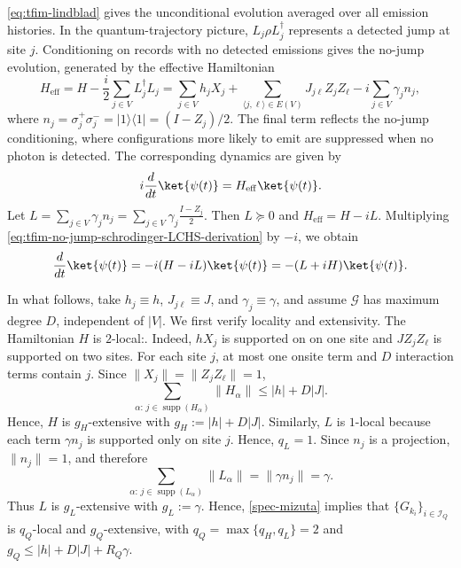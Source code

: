 \documentclass[10pt,reqno]{article}
\numberwithin{equation}{section}
\theoremstyle{plain}
\theoremstyle{definition}
\begin{document}
\cref{eq:tfim-lindblad} gives the unconditional evolution averaged over all emission histories. In the quantum-trajectory picture, \(L_j\rho L_j^\dagger\) represents a detected jump at site \(j\). Conditioning on records with no detected emissions gives the no-jump evolution, generated by the effective Hamiltonian
\begin{equation}\label{eq:tfim-effective-Hamiltonian}
H_{\operatorname{eff}} = H-\frac{i}{2}\sum_{j\in V}L_j^\dagger L_j = \sum_{j\in V} h_j X_j + \sum_{\langle j,\ell\rangle\in E(V)} J_{j\ell} Z_j Z_\ell - i\sum_{j\in V}\gamma_j n_j,
\end{equation}
where $n_j=\sigma_j^+\sigma_j^-= |1\rangle \langle 1|=(I-Z_j)/2$.
The final term reflects the no-jump conditioning, where configurations more likely to emit are suppressed when no photon is detected. The corresponding dynamics are given by
\begin{equation}\label{eq:tfim-no-jump-schrodinger-LCHS-derivation}
i\frac{d}{dt}\ket{\psi(t)} = H_{\mathrm{eff}}\ket{\psi(t)} .
\end{equation}
Let $L=\sum_{j\in V}\gamma_j n_j = \sum_{j\in V}\gamma_j \frac{I-Z_j}{2}$. Then \(L\succeq0\) and $H_{\operatorname{eff}} = H-iL$. Multiplying \cref{eq:tfim-no-jump-schrodinger-LCHS-derivation} by \(-i\), we obtain
\begin{equation}\label{eq:tfim-no-jump-LCHS-form}
\frac{d}{dt}\ket{\psi(t)} = -i(H-iL)\ket{\psi(t)}  = -(L+iH)\ket{\psi(t)}.
\end{equation}

In what follows, take \(h_j\equiv h\), \(J_{j\ell}\equiv J\), and \(\gamma_j\equiv\gamma\), and assume \(\mathcal G\) has maximum degree \(D\), independent of \(|V|\). We first verify locality and extensivity. The Hamiltonian \(H\) is \(2\)-local:. Indeed, \(hX_j\) is supported on on one site and \(JZ_jZ_\ell\) is supported on two sites. For each site \(j\), at most one onsite term and \(D\) interaction terms contain \(j\). Since \(\|X_j\|=\|Z_jZ_\ell\|=1\),
\begin{equation}
\sum_{\alpha:\,j\in\operatorname{supp}(H_\alpha)} \|H_\alpha\| \leq |h|+D|J|.
\label{eq:tfim-H-extensive-bound}
\end{equation}
Hence, \(H\) is \(g_H\)-extensive with \(g_H:=|h|+D|J|\). Similarly, \(L\) is \(1\)-local because each term \(\gamma n_j\) is supported only on site \(j\). Hence, $q_L=1$. Since \(n_j\) is a projection, \(\|n_j\|=1\), and therefore
\begin{equation}
\sum_{\alpha:\,j\in\operatorname{supp}(L_\alpha)} \|L_\alpha\| = \|\gamma n_j\| = \gamma .
\label{eq:tfim-L-extensive-bound}
\end{equation}
Thus \(L\) is \(g_L\)-extensive with $g_L:=\gamma$. Hence, \cref{spec-mizuta} implies that \(\{G_{k_i}\}_{i\in\mathcal I_Q}\) is \(q_Q\)-local and \(g_Q\)-extensive, with \(q_Q=\max\{q_H,q_L\}=2\) and \(g_Q\leq |h|+D|J|+R_Q\gamma\).
\end{document}
